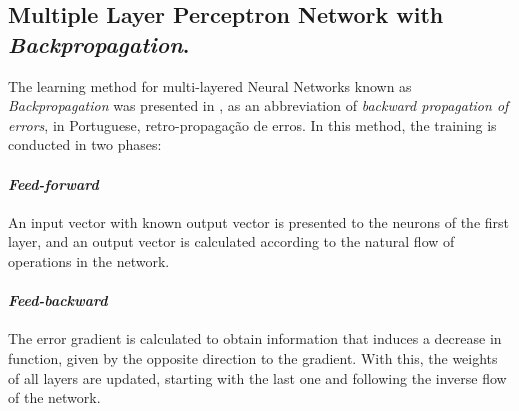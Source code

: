             \begin{figure}[ht]
            \end{figure}
    
        \subsection{Multiple Layer Perceptron Network with \textit{Backpropagation}.}
    
            The learning method for multi-layered Neural Networks known as \textit{Backpropagation} was presented in \cite{backp}, as an abbreviation of \textit{backward propagation of errors}, in Portuguese, retro-propagação de erros. In this method, the training is conducted in two phases:
        
            \paragraph*{\textit{ Feed-forward} } An input vector with known output vector is presented to the neurons of the first layer, and an output vector is calculated according to the natural flow of operations in the network.
             
            \paragraph*{\textit{Feed-backward}} The error gradient is calculated to obtain information that induces a decrease in function, given by the opposite direction to the gradient. With this, the weights of all layers are updated, starting with the last one and following the inverse flow of the network.
             
